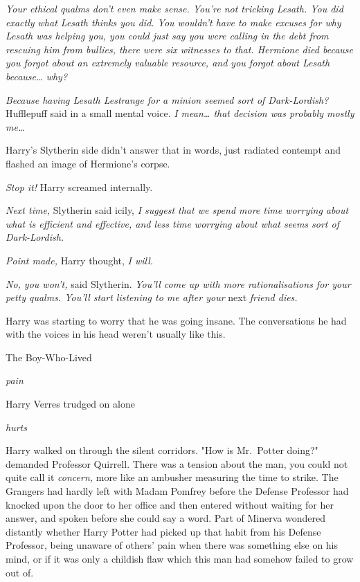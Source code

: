 \emph{Your ethical qualms don't even make sense. You're not tricking Lesath.
You did exactly what Lesath thinks you did. You wouldn't have to make excuses
for why Lesath was helping you, you could just say you were calling in the debt
from rescuing him from bullies, there were six witnesses to that. Hermione died
because you forgot about an extremely valuable resource, and you forgot about
Lesath because{\ldots} why?}

\emph{Because having Lesath Lestrange for a minion seemed sort of
Dark-Lordish?} Hufflepuff said in a small mental voice. \emph{I mean{\ldots}
that decision was probably mostly me{\ldots}}

Harry's Slytherin side didn't answer that in words, just radiated contempt and
flashed an image of Hermione's corpse.

\emph{Stop it!} Harry screamed internally.

\emph{Next time,} Slytherin said icily, \emph{I suggest that we spend more time
worrying about what is efficient and effective, and less time worrying about
what seems sort of Dark-Lordish.}

\emph{Point made,} Harry thought, \emph{I will.}

\emph{No, you won't,} said Slytherin. \emph{You'll come up with more
rationalisations for your petty qualms. You'll start listening to me after
your} next \emph{friend dies.}

Harry was starting to worry that he was going insane. The conversations he had
with the voices in his head weren't usually like this.

The Boy-Who-Lived

\emph{pain}

Harry Verres trudged on alone

\emph{hurts}

Harry walked on through the silent corridors.
\later
"How is Mr.~Potter doing?" demanded Professor Quirrell. There was a tension
about the man, you could not quite call it \emph{concern,} more like an
ambusher measuring the time to strike. The Grangers had hardly left with Madam
Pomfrey before the Defense Professor had knocked upon the door to her office
and then entered without waiting for her answer, and spoken before she could
say a word. Part of Minerva wondered distantly whether Harry Potter had picked
up that habit from his Defense Professor, being unaware of others' pain when
there was something else on his mind, or if it was only a childish flaw which
this man had somehow failed to grow out of.

